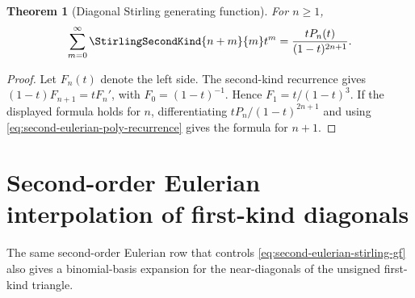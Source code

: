 \documentclass[11pt,a4paper,oneside,openany]{book}
\newtheorem{theorem}{Theorem}[chapter]
\theoremstyle{definition}
\theoremstyle{remark}
\begin{document}
\begin{theorem}[Diagonal Stirling generating function]\label{thm:second-eulerian-stirling-gf}
For $n\ge1$,
\begin{equation}\label{eq:second-eulerian-stirling-gf}
 \sum_{m=0}^{\infty}\StirlingSecondKind{n+m}{m}t^m
 =\frac{tP_n(t)}{(1-t)^{2n+1}}.
\end{equation}
\end{theorem}
\begin{proof}
Let $F_n(t)$ denote the left side.  The second-kind recurrence gives
$(1-t)F_{n+1}=tF_n'$, with $F_0=(1-t)^{-1}$.  Hence
$F_1=t/(1-t)^3$.  If the displayed formula holds for $n$, differentiating
$tP_n/(1-t)^{2n+1}$ and using
\eqref{eq:second-eulerian-poly-recurrence} gives the formula for $n+1$.
\end{proof}


\section{Second-order Eulerian interpolation of first-kind diagonals}
The same second-order Eulerian row that controls
\eqref{eq:second-eulerian-stirling-gf} also gives a binomial-basis expansion for
the near-diagonals of the unsigned first-kind triangle.
\end{document}
